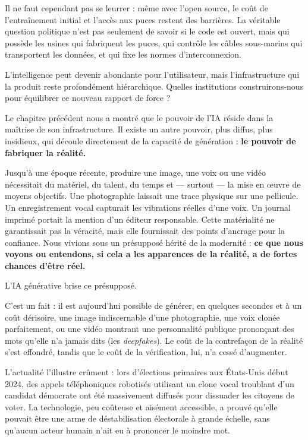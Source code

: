 Il ne faut cependant pas se leurrer : même avec l'open source, le coût de l'entraînement initial et l'accès aux puces restent des barrières. La véritable question politique n'est pas seulement de savoir si le code est ouvert, mais qui possède les usines qui fabriquent les puces, qui contrôle les câbles sous-marins qui transportent les données, et qui fixe les normes d'interconnexion.

\begin{aiquote}
L'intelligence peut devenir abondante pour l'utilisateur, mais l'infrastructure qui la produit reste profondément hiérarchique. Quelles institutions construirons-nous pour équilibrer ce nouveau rapport de force ?
\end{aiquote}


Le chapitre précédent nous a montré que le pouvoir de l'IA réside dans la maîtrise de son infrastructure. Il existe un autre pouvoir, plus diffus, plus insidieux, qui découle directement de la capacité de génération : \textbf{le pouvoir de fabriquer la réalité.}

Jusqu'à une époque récente, produire une image, une voix ou une vidéo nécessitait du matériel, du talent, du temps et — surtout — la mise en œuvre de moyens objectifs. Une photographie laissait une trace physique sur une pellicule. Un enregistrement vocal capturait les vibrations réelles d'une voix. Un journal imprimé portait la mention d'un éditeur responsable. Cette matérialité ne garantissait pas la véracité, mais elle fournissait des points d'ancrage pour la confiance. Nous vivions sous un présupposé hérité de la modernité : \textbf{ce que nous voyons ou entendons, si cela a les apparences de la réalité, a de fortes chances d'être réel.}

L'IA générative brise ce présupposé.

C'est un fait : il est aujourd'hui possible de générer, en quelques secondes et à un coût dérisoire, une image indiscernable d'une photographie, une voix clonée parfaitement, ou une vidéo montrant une personnalité publique prononçant des mots qu'elle n'a jamais dits (les \emph{deepfakes}). Le coût de la contrefaçon de la réalité s'est effondré, tandis que le coût de la vérification, lui, n'a cessé d'augmenter.

L'actualité l'illustre crûment : lors d'élections primaires aux États-Unis début 2024, des appels téléphoniques robotisés utilisant un clone vocal troublant d'un candidat démocrate ont été massivement diffusés pour dissuader les citoyens de voter. La technologie, peu coûteuse et aisément accessible, a prouvé qu'elle pouvait être une arme de déstabilisation électorale à grande échelle, sans qu'aucun acteur humain n'ait eu à prononcer le moindre mot.

